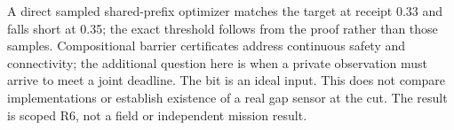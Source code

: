 \documentclass[11pt]{article}
\begin{document}
A direct sampled shared-prefix optimizer matches the target at
receipt 0.33 and falls short at 0.35; the exact threshold follows
from the proof rather than those samples. Compositional barrier
certificates address continuous safety and connectivity; the
additional question here is when a private observation must arrive
to meet a joint deadline. The bit is an ideal input. This does
not compare implementations or establish existence of a real
gap sensor at the cut. The result is scoped R6, not a field or
independent mission result.
\end{document}
